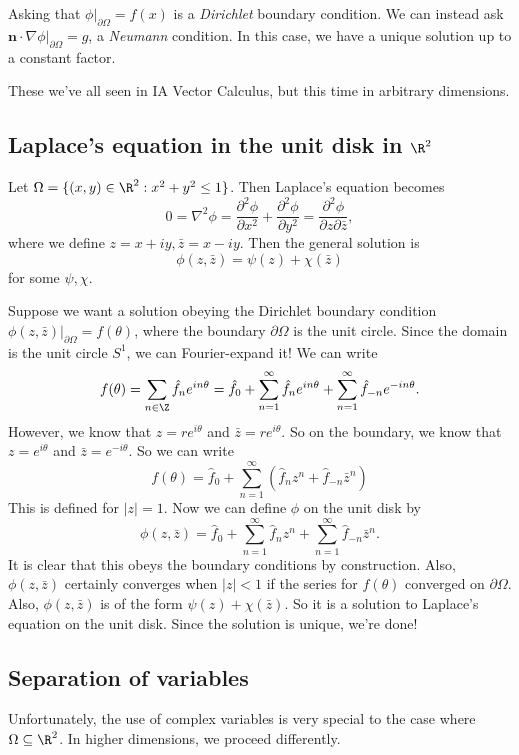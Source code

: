 \documentclass[a4paper]{article}
\begin{document}
Asking that $\phi|_{\partial \Omega} = f(x)$ is a \emph{Dirichlet} boundary condition. We can instead ask $\mathbf{n}\cdot \nabla \phi|_{\partial \Omega} = g$, a \emph{Neumann} condition. In this case, we have a unique solution up to a constant factor.

These we've all seen in IA Vector Calculus, but this time in arbitrary dimensions.

\subsection{Laplace's equation in the unit disk in \texorpdfstring{$\R^2$}{R2}}
Let $\Omega = \{(x, y) \in \R^2: x^2 + y^2 \leq 1\}$. Then Laplace's equation becomes
\[
  0 = \nabla^2 \phi = \frac{\partial^2 \phi}{\partial x^2} + \frac{\partial^2 \phi}{\partial y^2} = \frac{\partial^2 \phi}{\partial z \partial \bar{z}},
\]
where we define $z = x + iy, \bar z = x - iy$. Then the general solution is
\[
  \phi(z, \bar z) = \psi(z) + \chi(\bar z)
\]
for some $\psi, \chi$.

Suppose we want a solution obeying the Dirichlet boundary condition $\phi(z, \bar z) |_{\partial \Omega} = f(\theta)$, where the boundary $\partial \Omega$ is the unit circle. Since the domain is the unit circle $S^1$, we can Fourier-expand it! We can write
\[
  f(\theta) = \sum_{n \in \Z}\hat{f}_n e^{in\theta} = \hat{f}_0 + \sum_{n = 1}^\infty \hat{f}_n e^{in\theta} + \sum_{n = 1}^\infty \hat{f}_{-n} e^{-in\theta}.
\]
However, we know that $z = re^{i\theta}$ and $\bar{z} = re^{i\theta}$. So on the boundary, we know that $z = e^{i\theta}$ and $\bar z = e^{-i\theta}$. So we can write
\[
  f(\theta) = \hat{f}_0 + \sum_{n = 1}^\infty (\hat{f}_n z^n + \hat{f}_{-n}\bar{z}^n)
\]
This is defined for $|z| = 1$. Now we can define $\phi$ on the unit disk by
\[
  \phi(z, \bar z) = \hat{f}_0 + \sum_{n = 1}^\infty \hat{f}_n z^n + \sum_{n = 1}^\infty \hat{f}_{-n}\bar{z}^n.
\]
It is clear that this obeys the boundary conditions by construction. Also, $\phi(z, \bar{z})$ certainly converges when $|z| < 1$ if the series for $f(\theta)$ converged on $\partial \Omega$. Also, $\phi(z, \bar z)$ is of the form $\psi(z) + \chi(\bar z)$. So it is a solution to Laplace's equation on the unit disk. Since the solution is unique, we're done!

\subsection{Separation of variables}
Unfortunately, the use of complex variables is very special to the case where $\Omega \subseteq \R^2$. In higher dimensions, we proceed differently.
\end{document}
